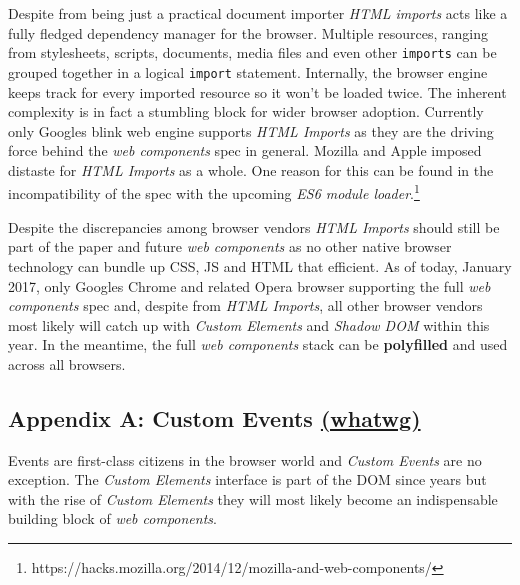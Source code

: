 \documentclass[]{assets/latex/ieee}
\begin{document}
Despite from being just a practical document importer \emph{HTML
imports} acts like a fully fledged dependency manager for the browser.
Multiple resources, ranging from stylesheets, scripts, documents, media
files and even other \texttt{imports} can be grouped together in a
logical \texttt{import} statement. Internally, the browser engine keeps
track for every imported resource so it won't be loaded twice. The
inherent complexity is in fact a stumbling block for wider browser
adoption. Currently only Googles blink web engine supports \emph{HTML
Imports} as they are the driving force behind the \emph{web components}
spec in general. Mozilla and Apple imposed distaste for \emph{HTML
Imports} as a whole. One reason for this can be found in the
incompatibility of the spec with the upcoming \emph{ES6 module
loader}.\footnote{https://hacks.mozilla.org/2014/12/mozilla-and-web-components/}

Despite the discrepancies among browser vendors \emph{HTML Imports}
should still be part of the paper and future \emph{web components} as no
other native browser technology can bundle up CSS, JS and HTML that
efficient. As of today, January 2017, only Googles Chrome and related
Opera browser supporting the full \emph{web components} spec and,
despite from \emph{HTML Imports}, all other browser vendors most likely
will catch up with \emph{Custom Elements} and \emph{Shadow DOM} within
this year. In the meantime, the full \emph{web components} stack can be
\textbf{polyfilled} and used across all browsers.

\subsection{\texorpdfstring{Appendix A: Custom Events
\href{https://dom.spec.whatwg.org/\#interface-customevent}{(whatwg)}}{Appendix A: Custom Events (whatwg)}}\label{appendix-a-custom-events-whatwg}

Events are first-class citizens in the browser world and \emph{Custom
Events} are no exception. The \emph{Custom Elements} interface is part
of the DOM since years but with the rise of \emph{Custom Elements} they
will most likely become an indispensable building block of \emph{web
components}.
\end{document}
